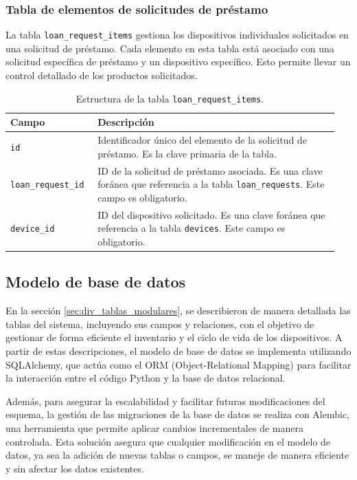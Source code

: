 \subsubsection*{Tabla de elementos de solicitudes de préstamo}

La tabla \texttt{loan\_request\_items} gestiona los dispositivos individuales solicitados en una solicitud de préstamo. Cada elemento en esta tabla está asociado con una solicitud específica de préstamo y un dispositivo específico. Esto permite llevar un control detallado de los productos solicitados.

\begin{table}[H]
  \centering
  \begin{tabular}{|p{0.25\linewidth}|p{0.7\linewidth}|}
    \hline
    \textbf{Campo} & \textbf{Descripción} \\
    \hline
    \texttt{id} & Identificador único del elemento de la solicitud de préstamo. Es la clave primaria de la tabla. \\
    \hline
    \texttt{loan\_request\_id} & ID de la solicitud de préstamo asociada. Es una clave foránea que referencia a la tabla \texttt{loan\_requests}. Este campo es obligatorio. \\
    \hline
    \texttt{device\_id} & ID del dispositivo solicitado. Es una clave foránea que referencia a la tabla \texttt{devices}. Este campo es obligatorio. \\
    \hline
  \end{tabular}
  \caption{Estructura de la tabla \texttt{loan\_request\_items}.}
  \label{tab:tabla_loan_request_items}
\end{table}

\subsection{Modelo de base de datos}\label{sec:modelo_DB}

En la sección \ref{sec:div_tablas_modulares}, se describieron de manera detallada las tablas del sistema, incluyendo sus campos y relaciones, con el objetivo de gestionar de forma eficiente el inventario y el ciclo de vida de los dispositivos. A partir de estas descripciones, el modelo de base de datos se implementa utilizando SQLAlchemy, que actúa como el ORM (Object-Relational Mapping) para facilitar la interacción entre el código Python y la base de datos relacional.

Además, para asegurar la escalabilidad y facilitar futuras modificaciones del esquema, la gestión de las migraciones de la base de datos se realiza con Alembic, una herramienta que permite aplicar cambios incrementales de manera controlada. Esta solución asegura que cualquier modificación en el modelo de datos, ya sea la adición de nuevas tablas o campos, se maneje de manera eficiente y sin afectar los datos existentes.

